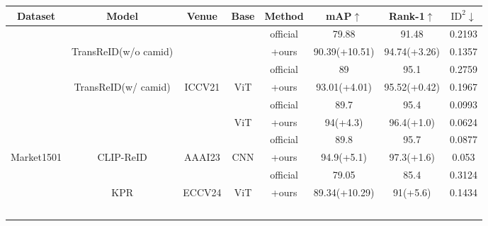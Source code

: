 

\begin{table}[ht]
\centering
\small
\renewcommand{\arraystretch}{0.95}
\renewcommand\tabcolsep{4pt}
\begin{tabular}{cc|c|c|c|c|ccc}
\hline 
\multicolumn{2}{c|}{Dataset} & Model & Venue & Base & Method & mAP$\uparrow$ & Rank-1$\uparrow$ & $\text{ID}^2$$\downarrow$ \\ \hline
\multicolumn{2}{c|}{} & & & & official & 79.88 & 91.48 & 0.2193 \\ \cline{6-9} 
\multicolumn{2}{c|}{} & \multirow{-2}{*}{TransReID\cite{he2021transreid}(w/o camid)} & & & +ours & 90.39\scriptsize{(+10.51)} & 94.74\scriptsize{(+3.26)} & 0.1357 \\ \cline{3-3} \cline{6-9} 
\multicolumn{2}{c|}{} & & & & official & 89 & 95.1 & 0.2759 \\ \cline{6-9} 
\multicolumn{2}{c|}{} & \multirow{-2}{*}{TransReID\cite{he2021transreid}(w/ camid)} & \multirow{-4}{*}{ICCV21} & \multirow{-4}{*}{ViT} & +ours & 93.01\scriptsize{(+4.01)} & 95.52\scriptsize{(+0.42)} & 0.1967 \\ \cline{3-9} 
\multicolumn{2}{c|}{} & & & & official & 89.7 & 95.4 & 0.0993 \\ \cline{6-9} 
\multicolumn{2}{c|}{} & & & \multirow{-2}{*}{ViT} & +ours & 94\scriptsize{(+4.3)} & 96.4\scriptsize{(+1.0)} & 0.0624 \\ \cline{5-9} 
\multicolumn{2}{c|}{} & & & & official & 89.8 & 95.7 & 0.0877 \\ \cline{6-9} 
\multicolumn{2}{c|}{\multirow{-8}{*}{Market1501}} & \multirow{-4}{*}{CLIP-ReID\cite{li2023clip}} & \multirow{-4}{*}{AAAI23} & \multirow{-2}{*}{CNN} & \cellcolor{gray!20}+ours & \cellcolor{gray!20}94.9\scriptsize{(+5.1)} & \cellcolor{gray!20}97.3\scriptsize{(+1.6)} & \cellcolor{gray!20}0.053 \\ \hline
\multicolumn{2}{c|}{} & & & & official & 79.05 & 85.4 & 0.3124 \\ \cline{6-9} 
\multicolumn{2}{c|}{} & \multirow{-2}{*}{KPR\cite{somers2025keypoint}} & \multirow{-2}{*}{ECCV24} & \multirow{-2}{*}{ViT} & \cellcolor{gray!20}+ours & \cellcolor{gray!20}89.34\scriptsize{(+10.29)} & \cellcolor{gray!20}91\scriptsize{(+5.6)} & \cellcolor{gray!20}0.1434 \\ \cline{3-9} 
$$
\end{tabular}
\end{table}
